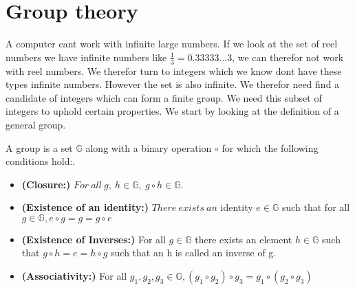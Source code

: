 
\section{Group theory}
A computer cant work with infinite large numbers. If we look at the set of reel numbers we have infinite numbers like $\frac{1}{3} = 0.33333...3$, we can therefor not work with reel numbers. We therefor turn to integers which we know dont have these types infinite numbers. However the set is also infinite. We therefor need find a candidate of integers which can form a finite group. We need this subset of integers to uphold certain properties. We start by looking at the definition of a general group.  

\begin{defi}
A \textnormal{group} is a set \begin{math}\mathbb{G}\end{math} along with a binary operation \begin{math}\circ \end{math} for which the following conditions hold:.
\begin{itemize}
\item \textnormal{\textbf{(Closure:)}}  \begin{math} For \ all \ g, \ h \in \mathbb{G},\ g \circ h \in \mathbb{G} \end{math}.
\item \textnormal{\textbf{(Existence of an identity:)}} \begin{math} There \ exists \ an \end{math} \textnormal{identity} \begin{math} e \in \mathbb{G} \end{math} such that for  all \begin{math} g \in \mathbb{G}, e \circ g = g =g \circ e \end{math}
\item \textnormal{\textbf{(Existence of Inverses:)}} For all \begin{math}g \in \mathbb{G}\end{math} there exists an element \begin{math}h \in \mathbb{G}\end{math} such that \begin{math}g \circ h = e =h \circ g \end{math} such that an h is called an \textnormal{inverse} of g.
\item \textnormal{\textbf{(Associativity:)}} For all \begin{math}g_1, g_2, g_3 \in \mathbb{G}, (g_1 \circ g_2) \circ g_3 = g_1 \circ( g_2 \circ g_3) \end{math}

\end{itemize}
\end{defi}
